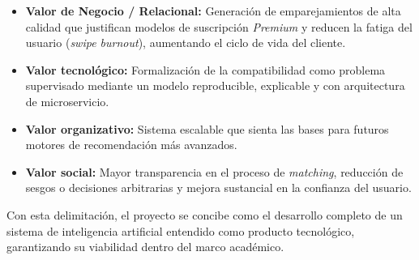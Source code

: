 \begin{itemize}
    \item \textbf{Valor de Negocio / Relacional:} Generación de emparejamientos de alta calidad que justifican modelos de suscripción \textit{Premium} y reducen la fatiga del usuario (\textit{swipe burnout}), aumentando el ciclo de vida del cliente.
    \item \textbf{Valor tecnológico:} Formalización de la compatibilidad como problema supervisado mediante un modelo reproducible, explicable y con arquitectura de microservicio.
    \item \textbf{Valor organizativo:} Sistema escalable que sienta las bases para futuros motores de recomendación más avanzados.
    \item \textbf{Valor social:} Mayor transparencia en el proceso de \textit{matching}, reducción de sesgos o decisiones arbitrarias y mejora sustancial en la confianza del usuario.
\end{itemize}

Con esta delimitación, el proyecto se concibe como el desarrollo completo de un sistema de inteligencia artificial entendido como producto tecnológico, garantizando su viabilidad dentro del marco académico.